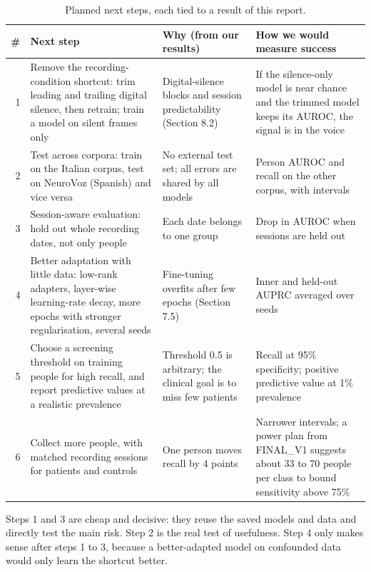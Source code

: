 \documentclass[11pt,a4paper]{article}
\begin{document}
\begin{table}[H]\centering\footnotesize\renewcommand{\arraystretch}{1.15}
\caption{Planned next steps, each tied to a result of this report.}
\begin{tabular}{rp{4.2cm}p{4.6cm}p{5.4cm}}
\toprule
\textbf{\#} & \textbf{Next step} & \textbf{Why (from our results)} & \textbf{How we would measure success}\\
\midrule
1 & Remove the recording-condition shortcut: trim leading and trailing digital silence, then retrain; train a model on silent frames only & Digital-silence blocks and session predictability (Section 8.2) & If the silence-only model is near chance and the trimmed model keeps its AUROC, the signal is in the voice\\
2 & Test across corpora: train on the Italian corpus, test on NeuroVoz (Spanish) and vice versa & No external test set; all errors are shared by all models & Person AUROC and recall on the other corpus, with intervals\\
3 & Session-aware evaluation: hold out whole recording dates, not only people & Each date belongs to one group & Drop in AUROC when sessions are held out\\
4 & Better adaptation with little data: low-rank adapters, layer-wise learning-rate decay, more epochs with stronger regularisation, several seeds & Fine-tuning overfits after few epochs (Section 7.5) & Inner and held-out AUPRC averaged over seeds\\
5 & Choose a screening threshold on training people for high recall, and report predictive values at a realistic prevalence & Threshold 0.5 is arbitrary; the clinical goal is to miss few patients & Recall at 95\% specificity; positive predictive value at 1\% prevalence\\
6 & Collect more people, with matched recording sessions for patients and controls & One person moves recall by 4 points & Narrower intervals; a power plan from FINAL\_V1 suggests about 33 to 70 people per class to bound sensitivity above 75\%\\
\bottomrule
\end{tabular}\end{table}
Steps 1 and 3 are cheap and decisive: they reuse the saved models and data and directly test the main risk. Step 2 is the real test of usefulness. Step 4 only makes sense after steps 1 to 3, because a better-adapted model on confounded data would only learn the shortcut better.
\end{document}
